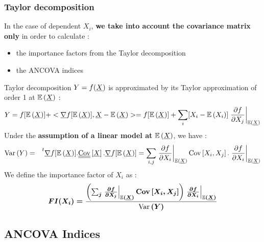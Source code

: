 \documentclass[8pt]{beamer}
\begin{document}


\begin{frame}
\frametitle{Taylor decomposition}
\small
In the case of dependent $X_i$, {\bf we  take into account the covariance matrix only} in order to calculate :
\begin{itemize}
 \item the importance factors from the Taylor decomposition
 \item the ANCOVA indices
\end{itemize}

  \begin{block}{Taylor decomposition}
 $Y=f({\underline{X}})$ is approximated by its  \alert{ Taylor approximation of order 1 at  $\mathbb{E}\left( {\underline{X}} \right)$} :
\begin{equation}
Y = f[\mathbb{E}\left( {\underline{X}} \right)] + <{\underline{\nabla }}f[\mathbb{E}\left( {\underline{X}} \right)], {\underline{X}} -\mathbb{E}\left( {\underline{X}} \right)> =  f[\mathbb{E}\left( {\underline{X}} \right)] + \sum_i [X_i-\mathbb{E}\left( X_i \right)]\left.\frac{\partial f}{\partial X_j}\right|_{\mathbb{E}\left( {\underline{X}} \right)}
\end{equation}
Under the  {\bf assumption of a linear model at} $\mathbb{E}\left( {\underline{X}} \right)$, we have :
\begin{eqnarray}
\mbox{Var}\left( Y \right) & = & \strut^t {\underline{\nabla }}f[\mathbb{E}\left( {\underline{X}} \right)].{\underline{\underline{\rm Cov}}}\left[ {\underline{X}} \right]. {\underline{\nabla }}f[\mathbb{E}\left( {\underline{X}} \right)] = \sum_{i,j} \displaystyle \left.\frac{\partial f}{\partial X_i}\right|_{\mathbb{E}\left( {\underline{X}} \right)}{\rm Cov} \left[ X_i, X_j \right].\left.\frac{\partial f}{\partial X_i}\right|_{\mathbb{E}\left( {\underline{X}} \right)}
\end{eqnarray}
We define the  \alert{ importance factor of $X_i$} as :
\begin{equation}
\label{FI}
\boldsymbol{FI(X_i) = \displaystyle \frac{\left(\sum_{j} \left.\frac{\partial f}{\partial X_j}\right|_{\mathbb{E}\left( {\underline{X}} \right)}{\rm Cov} \left[ X_i, X_j \right]\right)  \left.\frac{\partial f}{\partial X_i}\right|_{\mathbb{E}\left( {\underline{X}} \right)}}{\mbox{Var}\left( Y \right)}}
\end{equation}
\end{block}

\end{frame}



\subsection{ ANCOVA Indices}
\end{document}
